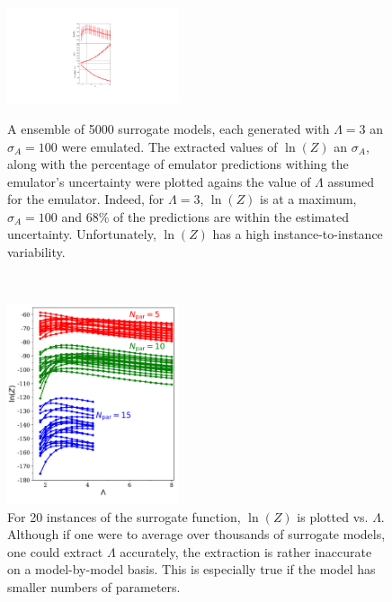 \documentclass[UserManual.tex]{subfiles}
\begin{document}
\begin{figure}
\parbox[t]{0.45\textwidth}{
\centerline{\includegraphics[width=0.45\textwidth]{figs/vslambda_trial}}
\caption{\label{fig:vslambda}
A ensemble of 5000 surrogate models, each generated with $\Lambda=3$ an $\sigma_A=100$ were emulated. The extracted values of $\ln(Z)$ an $\sigma_A$, along with the percentage of emulator predictions withing the emulator's uncertainty were plotted agains the value of $\Lambda$ assumed for the emulator. Indeed, for $\Lambda=3$, $\ln(Z)$ is at a maximum, $\sigma_A=100$ and 68\% of the predictions are within the estimated uncertainty. Unfortunately, $\ln(Z)$ has a high instance-to-instance variability.}}
~~~~\parbox[t]{0.45\textwidth}{ \vspace*{-266pt}
\centerline{\includegraphics[width=0.45\textwidth]{figs/logPinstances}}
\caption{\label{fig:logPinstances}
For 20 instances of the surrogate function, $\ln(Z)$ is plotted vs. $\Lambda$. Although if one were to average over thousands of surrogate models, one could extract $\Lambda$ accurately, the extraction is rather inaccurate on a model-by-model basis. This is especially true if the model has smaller numbers of parameters.}}
\end{figure}
\end{document}
